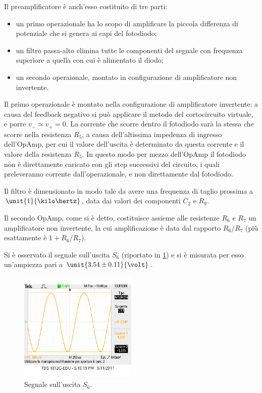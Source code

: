\documentclass[a4paper,10pt]{article}
\begin{document}
Il preamplificatore è anch'esso costituito di tre parti:
\begin{itemize}
	\item un primo operazionale ha lo scopo di amplificare la piccola differenza di potenziale che si genera ai capi del fotodiodo;
	\item un filtro passa-alto elimina tutte le componenti del segnale con frequenza superiore a quella con cui è alimentato il diodo;
	\item un secondo operaionale, montato in configurazione di amplificatore non invertente.
\end{itemize}

Il primo operazionale è montato nella configurazione di amplificatore invertente: a causa del feedback negativo si può applicare il metodo del cortocircuito virtuale, e porre $ v_- \simeq v_+ = 0 $.
La corrente che scorre dentro il fotodiodo sarà la stessa che scorre nella resistenza $ R_5 $, a causa dell'altissima impedenza di ingresso dell'OpAmp, per cui il valore dell'uscita è determinato da questa corrente e il valore della resistenza $ R_5 $.
In questo modo per mezzo dell'OpAmp il fotodiodo non è direttamente caricato con gli step successivi del circuito, i quali preleveranno corrente dall'operazionale, e non direttamente dal fotodiodo.

Il filtro è dimensionato in modo tale da avere una frequenza di taglio prossima a $ \unit{1}{\kilo\hertz} $, data dai valori dei componenti $ C_2 $ e $ R_9 $.

Il secondo OpAmp, come si è detto, costituisce assieme alle resistenze $ R_6 $ e $ R_7 $ un amplificatore non invertente, la cui amplificazione è data dal rapporto $ R_6/R_7 $ (più esattamente è $ 1 + R_6/R_7 $).
\newline

Si è osservato il segnale sull'uscita $ S_6 $ (riportato in \cref{fig:s6}) e si è misurata per esso un'ampiezza pari a $ \unit{3.54 \pm 0.11}{\volt} $.

\begin{figure}[H]
	\centering
	\includegraphics[width=0.5\textwidth]{../grafici/s6.png}
	\vspace{-10pt}
	\caption{Segnale sull'uscita $ S_6 $.}
	\label{fig:s6}
\end{figure}
\end{document}
